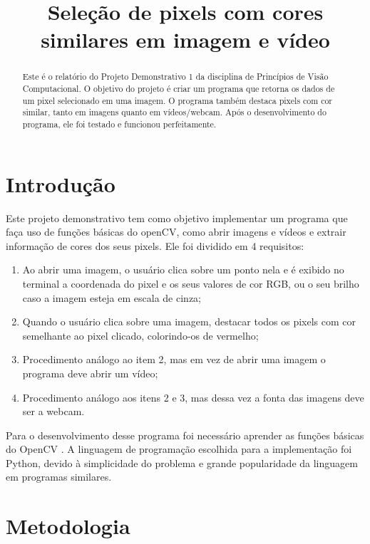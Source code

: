 \documentclass{bmvc2k}
\title{Seleção de pixels com cores \\similares em imagem e vídeo}
\begin{document}

\maketitle

\begin{abstract}
Este é o relatório do Projeto Demonstrativo 1 da disciplina de Princípios de Visão Computacional. O objetivo do projeto é criar um programa que retorna os dados de um pixel selecionado em uma imagem. O programa também destaca pixels com cor similar, tanto em imagens quanto em vídeos/webcam. Após o desenvolvimento do programa, ele foi testado e funcionou perfeitamente.
\end{abstract}


\section{Introdução}
\label{sec:intro}

Este projeto demonstrativo tem como objetivo implementar um programa que faça uso de funções básicas do openCV, como abrir imagens e vídeos e extrair informação de cores dos seus pixels. Ele foi dividido em 4 requisitos:
\begin{enumerate}
    \item Ao abrir uma imagem, o usuário clica sobre um ponto nela e é exibido no terminal a coordenada do pixel e os seus valores de cor RGB, ou o seu brilho caso a imagem esteja em escala de cinza;
    \item Quando o usuário clica sobre uma imagem, destacar todos os pixels com cor semelhante ao pixel clicado, colorindo-os de vermelho;
    \item Procedimento análogo ao item 2, mas em vez de abrir uma imagem o programa deve abrir um vídeo;
    \item Procedimento análogo aos itens 2 e 3, mas dessa vez a fonta das imagens deve ser a webcam.
\end{enumerate}

Para o desenvolvimento desse programa foi necessário aprender as funções básicas do OpenCV \cite{opencv}. A linguagem de programação escolhida para a implementação foi Python, devido à simplicidade do problema e grande popularidade da linguagem em programas similares.

\section{Metodologia}
\label{sec:met}
\end{document}
